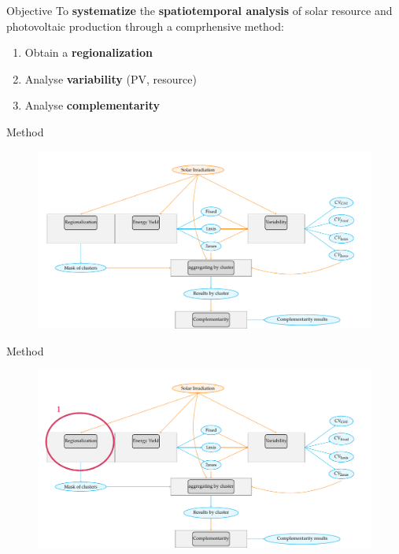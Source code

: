 \documentclass{beamer}%
\begin{document}
\begin{frame}[fragile]{Objective}
To \textbf{\alert{systematize}} the \textbf{\alert{spatiotemporal analysis}} of solar resource and photovoltaic production through a comprhensive method:
  \begin{enumerate}
  \item Obtain a \textbf{regionalization}
  \item Analyse \textbf{variability} (PV, resource)
  \item Analyse \textbf{complementarity}
  \end{enumerate}
\end{frame}


 
\begin{frame}[fragile]{Method}
\begin{figure}  
\includegraphics[scale=0.45]{multi_step.pdf}
\end{figure}
\end{frame}

\begin{frame}[fragile]{Method}
\begin{figure}  
\includegraphics[scale=0.45]{multi_step1.pdf}
\end{figure}
\end{frame}
\end{document}
